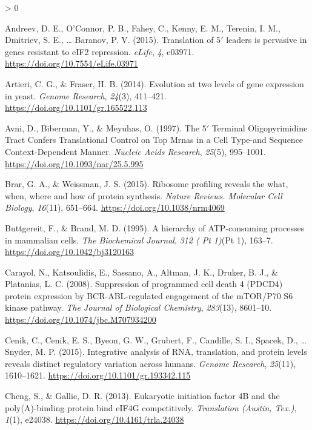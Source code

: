 \documentclass[
  12pt,
  openany]{book}
\newlength{\cslhangindent}
\newenvironment{CSLReferences}[2] %
 {%
  \setlength{\parindent}{0pt}
  \ifodd #1 \everypar{\setlength{\hangindent}{\cslhangindent}}\ignorespaces\fi
  \ifnum #2 > 0
  \setlength{\parskip}{#2\baselineskip}
  \fi
 }%
 {}
\begin{document}
\hypertarget{refs}{}
\begin{CSLReferences}{1}{0}
\leavevmode\hypertarget{ref-Andreev2015}{}%
Andreev, D. E., O'Connor, P. B., Fahey, C., Kenny, E. M., Terenin, I. M., Dmitriev, S. E., \ldots{} Baranov, P. V. (2015). Translation of 5{\({'}\)} leaders is pervasive in genes resistant to {eIF2} repression. \emph{eLife}, \emph{4}, e03971. \url{https://doi.org/10.7554/eLife.03971}

\leavevmode\hypertarget{ref-Artieri2014}{}%
Artieri, C. G., \& Fraser, H. B. (2014). Evolution at two levels of gene expression in yeast. \emph{Genome Research}, \emph{24}(3), 411--421. \url{https://doi.org/10.1101/gr.165522.113}

\leavevmode\hypertarget{ref-Avni1997}{}%
Avni, D., Biberman, Y., \& Meyuhas, O. (1997). The 5{\({'}\)} {Terminal Oligopyrimidine Tract Confers Translational Control} on {Top Mrnas} in a {Cell Type}-and {Sequence Context}-{Dependent Manner}. \emph{Nucleic Acids Research}, \emph{25}(5), 995--1001. \url{https://doi.org/10.1093/nar/25.5.995}

\leavevmode\hypertarget{ref-Brar2015}{}%
Brar, G. A., \& Weissman, J. S. (2015). Ribosome profiling reveals the what, when, where and how of protein synthesis. \emph{Nature Reviews. Molecular Cell Biology}, \emph{16}(11), 651--664. \url{https://doi.org/10.1038/nrm4069}

\leavevmode\hypertarget{ref-Buttgereit1995}{}%
Buttgereit, F., \& Brand, M. D. (1995). A hierarchy of {ATP}-consuming processes in mammalian cells. \emph{The Biochemical Journal}, \emph{312 ( Pt 1)}(Pt 1), 163--7. \url{https://doi.org/10.1042/bj3120163}

\leavevmode\hypertarget{ref-Carayol2008}{}%
Carayol, N., Katsoulidis, E., Sassano, A., Altman, J. K., Druker, B. J., \& Platanias, L. C. (2008). Suppression of programmed cell death 4 ({PDCD4}) protein expression by {BCR}-{ABL}-regulated engagement of the {mTOR}/P70 {S6} kinase pathway. \emph{The Journal of Biological Chemistry}, \emph{283}(13), 8601--10. \url{https://doi.org/10.1074/jbc.M707934200}

\leavevmode\hypertarget{ref-Cenik2015}{}%
Cenik, C., Cenik, E. S., Byeon, G. W., Grubert, F., Candille, S. I., Spacek, D., \ldots{} Snyder, M. P. (2015). Integrative analysis of {RNA}, translation, and protein levels reveals distinct regulatory variation across humans. \emph{Genome Research}, \emph{25}(11), 1610--1621. \url{https://doi.org/10.1101/gr.193342.115}

\leavevmode\hypertarget{ref-Cheng2013}{}%
Cheng, S., \& Gallie, D. R. (2013). Eukaryotic initiation factor {4B} and the poly({A})-binding protein bind {eIF4G} competitively. \emph{Translation (Austin, Tex.)}, \emph{1}(1), e24038. \url{https://doi.org/10.4161/trla.24038}


\end{CSLReferences}
\end{document}
